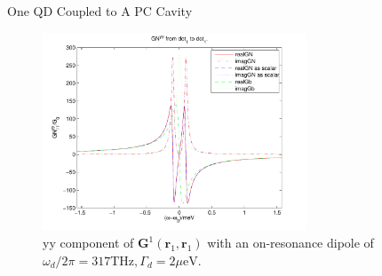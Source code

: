 \documentclass{beamer}
\begin{document}
\begin{frame}{One QD Coupled to A PC Cavity}
\begin{figure}[H]
\centering
\begin{center}
\includegraphics[width=0.7\textwidth]{./Figs/G84_yy11_1}
\end{center}
\caption[yy component of $G^1(\mathbf{r}_1,\mathbf{r}_1)$ with an on-resonance dipole.]{ yy component of $\mathbf{G}^1(\mathbf{r}_1,\mathbf{r}_1)$ with an on-resonance dipole of $\omega_d/2\pi = 317 {\text {THz}}, \Gamma_d = 2 \mu{\text {eV}}$.}
\label{G84_yy11_1}
\end{figure}
\end{frame}
\end{document}
